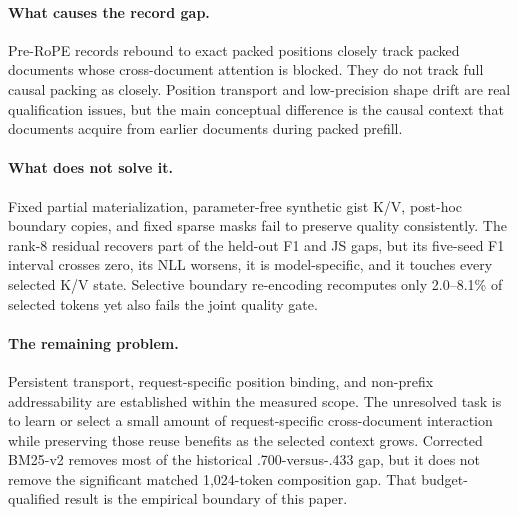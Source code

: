 \documentclass[11pt]{article}
\begin{document}
\paragraph{What causes the record gap.}
Pre-RoPE records rebound to exact packed positions closely track packed
documents whose cross-document attention is blocked. They do not track full
causal packing as closely. Position transport and low-precision shape drift are
real qualification issues, but the main conceptual difference is the causal
context that documents acquire from earlier documents during packed prefill.

\paragraph{What does not solve it.}
Fixed partial materialization, parameter-free synthetic gist K/V, post-hoc
boundary copies, and fixed sparse masks fail to preserve quality consistently.
The rank-8 residual recovers part of the held-out F1 and JS gaps, but its
five-seed F1 interval crosses zero, its NLL worsens, it is model-specific, and
it touches every selected K/V state. Selective boundary re-encoding recomputes
only 2.0--8.1\% of selected tokens yet also fails the joint quality gate.

\paragraph{The remaining problem.}
Persistent transport, request-specific position binding, and non-prefix
addressability are established within the measured scope. The unresolved task
is to learn or select a small amount of request-specific cross-document
interaction while preserving those reuse benefits as the selected context
grows. Corrected BM25-v2 removes most of the historical .700-versus-.433 gap,
but it does not remove the significant matched 1,024-token composition gap.
That budget-qualified result is the empirical boundary of this paper.




\appendix
\end{document}
